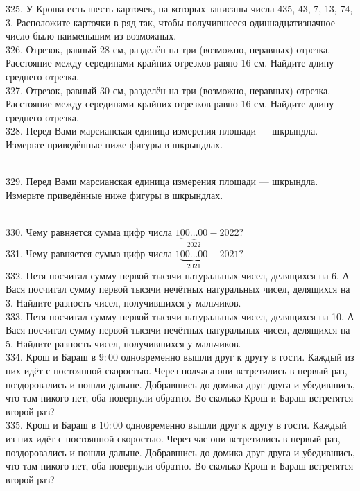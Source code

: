 325. У Кроша есть шесть карточек, на которых записаны числа 435, 43, 7, 13, 74, 3. Расположите карточки в ряд так, чтобы получившееся одиннадцатизначное число было наименьшим из возможных.\\
326. Отрезок, равный 28 см, разделён на три (возможно, неравных) отрезка. Расстояние между серединами крайних отрезков равно 16 см. Найдите длину среднего отрезка.\\
327. Отрезок, равный 30 см, разделён на три (возможно, неравных) отрезка. Расстояние между серединами крайних отрезков равно 16 см. Найдите длину среднего отрезка.\\
328. Перед Вами марсианская единица измерения площади --- шкрындла. Измерьте приведённые ниже фигуры в
шкрындлах.\\
\begin{figure}[ht!]
\end{figure}\\
329. Перед Вами марсианская единица измерения площади --- шкрындла. Измерьте приведённые ниже фигуры в
шкрындлах.\\
\begin{figure}[ht!]
\end{figure}\\
330. Чему равняется сумма цифр числа $1\underbrace{00\ldots00}_{2022}-2022?$\\
331. Чему равняется сумма цифр числа $1\underbrace{00\ldots00}_{2021}-2021?$\\
332. Петя посчитал сумму первой тысячи натуральных чисел, делящихся на 6. А Вася посчитал сумму первой тысячи нечётных натуральных чисел, делящихся на 3. Найдите разность чисел, получившихся у мальчиков.\\
333. Петя посчитал сумму первой тысячи натуральных чисел, делящихся на 10. А Вася посчитал сумму первой тысячи нечётных натуральных чисел, делящихся на 5. Найдите разность чисел, получившихся у мальчиков.\\
334. Крош и Бараш в $9:00$ одновременно вышли друг к другу в гости. Каждый из них идёт с постоянной скоростью. Через полчаса они встретились в первый раз, поздоровались и пошли дальше. Добравшись до домика друг друга и убедившись, что там никого нет, оба повернули обратно. Во сколько Крош и Бараш встретятся второй раз?\\
335. Крош и Бараш в $10:00$ одновременно вышли друг к другу в гости. Каждый из них идёт с постоянной скоростью. Через час они встретились в первый раз, поздоровались и пошли дальше. Добравшись до домика друг друга и убедившись, что там никого нет, оба повернули обратно. Во сколько Крош и Бараш встретятся второй раз?\\
